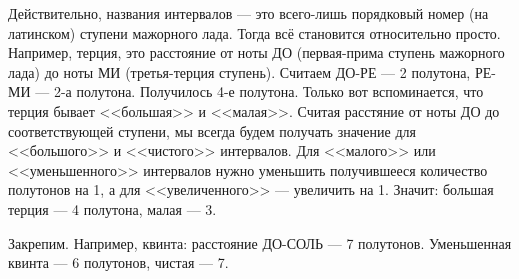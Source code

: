 Действительно, названия интервалов --- это всего-лишь порядковый номер (на латинском) ступени мажорного лада. Тогда всё становится относительно просто. Например, терция, это расстояние от ноты ДО (первая-прима ступень мажорного лада) до ноты МИ (третья-терция ступень). Считаем ДО-РЕ --- 2 полутона, РЕ-МИ --- 2-а полутона. Получилось 4-е полутона. Только вот вспоминается, что терция бывает <<большая>> и <<малая>>. Считая расстяние от ноты ДО до соответствующей ступени, мы всегда будем получать значение для <<большого>> и <<чистого>> интервалов. Для <<малого>> или <<уменьшенного>> интервалов нужно уменьшить получившееся количество полутонов на 1, а для <<увеличенного>> --- увеличить на 1. Значит: большая терция --- 4 полутона, малая --- 3.

Закрепим. Например, квинта: расстояние ДО-СОЛЬ --- 7 полутонов. Уменьшенная квинта --- 6 полутонов, чистая --- 7.
